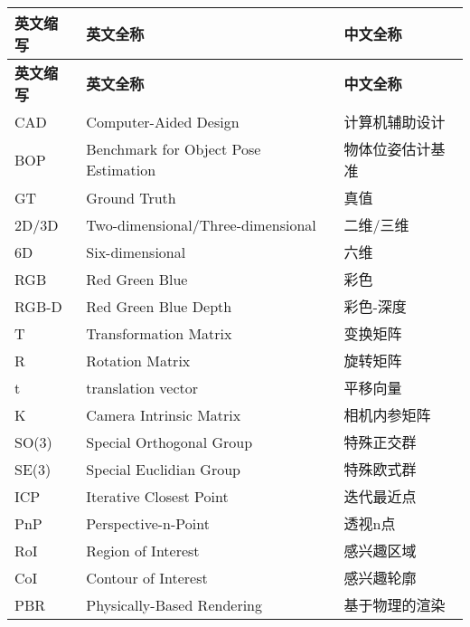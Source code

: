 \cleardoublepage
{}
\begin{center}
    \begin{longtable}{m{2cm}m{8cm}m{5cm}}
        \toprule
        \textbf{英文缩写}&\textbf{英文全称}&\textbf{中文全称}\\
        \midrule
        \endfirsthead
        \toprule
        \textbf{英文缩写}&\textbf{英文全称}&\textbf{中文全称}\\
        \midrule
        \endhead 
        \bottomrule
        \endfoot
        \bottomrule
        \endlastfoot
        CAD&Computer-Aided Design&计算机辅助设计\\
        BOP&Benchmark for Object Pose Estimation&物体位姿估计基准\\
        GT&Ground Truth&真值\\
        2D/3D&Two-dimensional/Three-dimensional&二维/三维\\
        6D&Six-dimensional&六维\\
        RGB&Red Green Blue&彩色\\
        RGB-D&Red Green Blue Depth&彩色-深度\\
        T&Transformation Matrix&变换矩阵\\
        R&Rotation Matrix&旋转矩阵\\
        t&translation vector&平移向量\\
        K&Camera Intrinsic Matrix&相机内参矩阵\\
        SO(3)&Special Orthogonal Group&特殊正交群\\
        SE(3)&Special Euclidian Group&特殊欧式群\\
        ICP&Iterative Closest Point&迭代最近点\\
        PnP&Perspective-n-Point&透视n点\\
        RoI&Region of Interest&感兴趣区域\\
        CoI&Contour of Interest&感兴趣轮廓\\
        PBR&Physically-Based Rendering&基于物理的渲染\\

	\end{longtable}
\end{center}